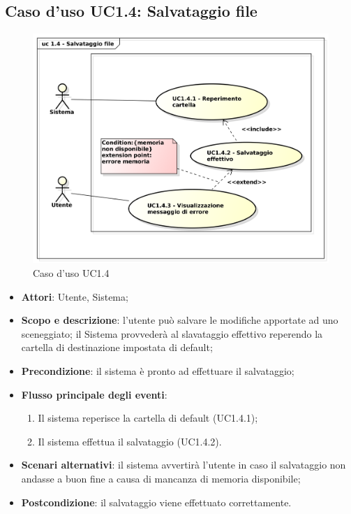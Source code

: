 \subsection{Caso d'uso UC1.4: Salvataggio file}

\begin{figure}[htbp]
\centering
\includegraphics[scale=0.5]{UseCase_17_03_2016/immagini/uc_1_4_salvataggio_file.png}
\captionsetup{labelfont=bf}
\caption{Caso d'uso UC1.4}
\end{figure}

\begin{itemize}
\item \textbf{Attori}: Utente, Sistema;
\item \textbf{Scopo e descrizione}: l'utente può salvare le modifiche apportate ad uno sceneggiato; il Sistema provvederà al slavataggio effettivo reperendo la cartella di destinazione impostata di default;
\item \textbf{Precondizione}: il sistema è pronto ad effettuare il salvataggio;
\item \textbf{Flusso principale degli eventi}:
\begin{enumerate}
\item Il sistema reperisce la cartella di default (UC1.4.1);
\item Il sistema effettua il salvataggio (UC1.4.2).
\end{enumerate}
\item \textbf{Scenari alternativi}: il sistema avvertirà l'utente in caso il salvataggio non andasse a buon fine a causa di mancanza di memoria disponibile;  
\item \textbf{Postcondizione}: il salvataggio viene effettuato correttamente. 
\end{itemize}

